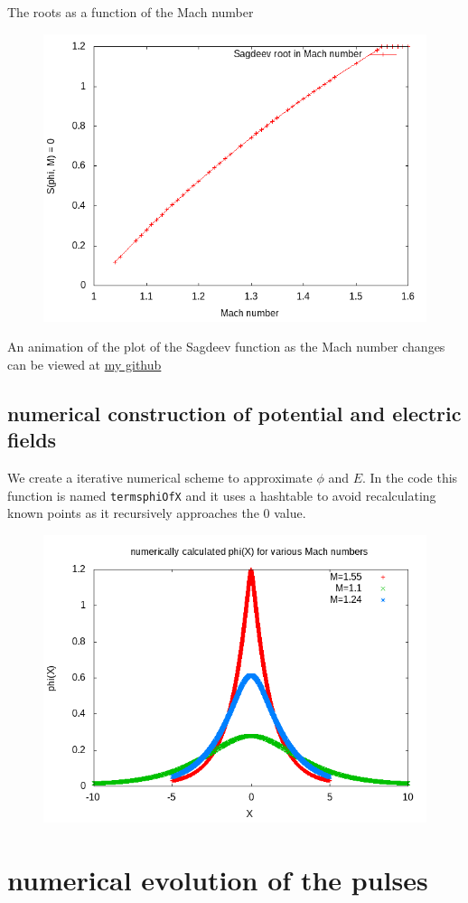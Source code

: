 \documentclass{report}
\begin{document}
The roots as a function of the Mach number
\begin{figure}
\includegraphics{sagdeevroots.png}
\end{figure}
An animation of the plot of the Sagdeev function as the Mach number changes can be viewed at 
\href{https://github.com/ramrunner/mhd-lisp/blob/master/doc/anim.gif}{my github}

\subsection{numerical construction of potential and electric fields}
We create a iterative numerical scheme to approximate $\phi$ and $E$. In the code this 
function is named {\tt termsphiOfX} and it uses a hashtable to avoid recalculating known points
as it recursively approaches the 0 value.
\begin{figure}
\includegraphics{phiofxvarm.png}
\end{figure}

\section{numerical evolution of the pulses}
\end{document}
